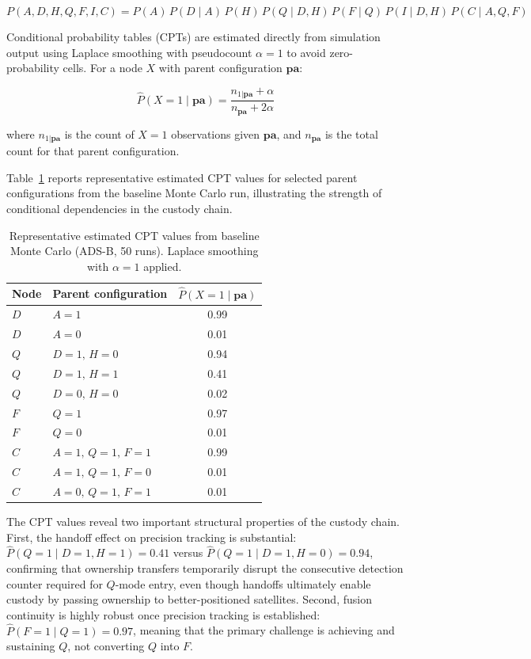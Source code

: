 \documentclass[]{spie}
\begin{document}
\begin{equation}
    P(A,D,H,Q,F,I,C) = P(A)\,P(D \mid A)\,P(H)\,P(Q \mid D,H)\,P(F \mid Q)\,P(I \mid D,H)\,P(C \mid A,Q,F)  
    \label{eq:joint}
\end{equation}

Conditional probability tables (CPTs) are estimated directly from simulation output 
using Laplace smoothing with pseudocount $\alpha = 1$ to avoid zero-probability cells. 
For a node $X$ with parent configuration $\mathbf{pa}$:

\begin{equation}
    \hat{P}(X{=}1 \mid \mathbf{pa}) = 
    \frac{n_{1|\mathbf{pa}} + \alpha}
        {n_{\mathbf{pa}} + 2\alpha}
    \label{eq:laplace}
\end{equation}

where $n_{1|\mathbf{pa}}$ is the count of $X{=}1$ observations given $\mathbf{pa}$, 
and $n_{\mathbf{pa}}$ is the total count for that parent configuration. 

Table~\ref{tab:cpt} reports representative 
estimated CPT values for selected parent 
configurations from the baseline Monte Carlo 
run, illustrating the strength of conditional 
dependencies in the custody chain.

\begin{table}[h]
\caption{Representative estimated CPT values 
from baseline Monte Carlo (ADS-B, 50 runs). 
Laplace smoothing with $\alpha = 1$ applied.}
\label{tab:cpt}
\centering
\begin{tabular}{llc}
\toprule
Node & Parent configuration & 
$\hat{P}(X{=}1 \mid \mathbf{pa})$ \\
\midrule
$D$ & $A{=}1$ & 0.99 \\
$D$ & $A{=}0$ & 0.01 \\
$Q$ & $D{=}1,\, H{=}0$ & 0.94 \\
$Q$ & $D{=}1,\, H{=}1$ & 0.41 \\
$Q$ & $D{=}0,\, H{=}0$ & 0.02 \\
$F$ & $Q{=}1$ & 0.97 \\
$F$ & $Q{=}0$ & 0.01 \\
$C$ & $A{=}1,\, Q{=}1,\, F{=}1$ & 0.99 \\
$C$ & $A{=}1,\, Q{=}1,\, F{=}0$ & 0.01 \\
$C$ & $A{=}0,\, Q{=}1,\, F{=}1$ & 0.01 \\
\bottomrule
\end{tabular}
\end{table}

The CPT values reveal two important structural properties of the custody chain. First, the handoff effect on precision tracking is substantial: $\hat{P}(Q{=}1 \mid D{=}1, H{=}1) = 0.41$ versus $\hat{P}(Q{=}1 \mid D{=}1, H{=}0) = 0.94$, confirming that ownership transfers temporarily disrupt the consecutive detection counter required for $Q$-mode entry, even though handoffs ultimately enable custody by passing ownership to better-positioned satellites. Second, fusion continuity is highly robust once precision tracking is established: $\hat{P}(F{=}1 \mid Q{=}1) = 0.97$, meaning that the primary challenge is achieving and sustaining $Q$, not converting $Q$ into $F$.
\end{document}
